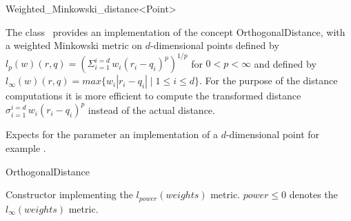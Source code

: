 

\begin{ccRefClass}{Weighted_Minkowski_distance<Point>}  %


\ccDefinition
   
The class \ccRefName\ provides an implementation of the concept OrthogonalDistance, with a weighted Minkowski metric
on $d$-dimensional points
defined by $l_p(w)(r,q)= ({\Sigma_{i=1}^{i=d} \, w_i(r_i-q_i)^p})^{1/p}$ for $0 < p <\infty$ and
defined by $l_{\infty}(w)(r,q)=max \{w_i |r_i-q_i| \mid 1 \leq i \leq d\}$.
For the purpose of the distance computations it is more efficient to compute
the transformed distance ${\sigma_{i=1}^{i=d} \, w_i(r_i-q_i)^p}$ instead of the actual distance.


\ccParameters

Expects for the parameter
 an implementation
of a $d$-dimensional point
for example .

\ccIsModel

OrthogonalDistance

\ccTypes

 

\ccCreation
{}  %


{Constructor implementing the $l_{power}(weights)$ metric. $power \leq 0$ denotes the $l_{\infty}(weights)$ metric.}


\end{ccRefClass}
